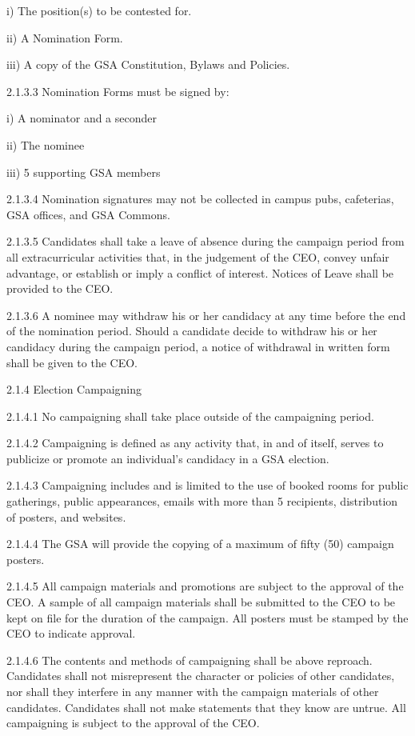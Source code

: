  i) The position(s) to be contested for. 
 
 ii) A Nomination Form. 
 
 iii) A copy of the GSA Constitution, Bylaws and Policies. 
 
 2.1.3.3 Nomination Forms must be signed by: 
 
 i) A nominator and a seconder 
 
 ii) The nominee 
 
 iii) 5 supporting GSA members 
 
 2.1.3.4 Nomination signatures may not be collected in campus pubs, cafeterias, GSA offices, and GSA Commons. 
 
 2.1.3.5 Candidates shall take a leave of absence during the campaign period from all extracurricular activities that, in the judgement of the CEO, convey unfair advantage, or establish or imply a conflict of interest. Notices of Leave shall be provided to the CEO. 
 
 2.1.3.6 A nominee may withdraw his or her candidacy at any time before the end of the nomination period. Should a candidate decide to withdraw his or her candidacy during the campaign period, a notice of withdrawal in written form shall be given to the CEO. 
 
 2.1.4 Election Campaigning 
 
 2.1.4.1 No campaigning shall take place outside of the campaigning period. 
 
 2.1.4.2 Campaigning is defined as any activity that, in and of itself, serves to publicize or promote an individual’s candidacy in a GSA election. 

 2.1.4.3 Campaigning includes and is limited to the use of booked rooms for public gatherings, public appearances, emails with more than 5 recipients, distribution of posters, and websites. 
 
 2.1.4.4 The GSA will provide the copying of a maximum of fifty (50) campaign posters. 
 
 2.1.4.5 All campaign materials and promotions are subject to the approval of the CEO. A sample of all campaign materials shall be submitted to the CEO to be kept on file for the duration of the campaign. All posters must be stamped by the CEO to indicate approval. 
 
 2.1.4.6 The contents and methods of campaigning shall be above reproach. Candidates shall not misrepresent the character or policies of other candidates, nor shall they interfere in any manner with the campaign materials of other candidates. Candidates shall not make statements that they know are untrue. All campaigning is subject to the approval of the CEO. 
 
